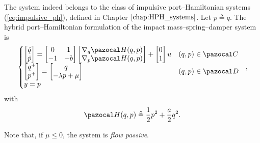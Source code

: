 \begin{rem}
    The system indeed belongs to the class of impulsive port--Hamiltonian systems (\ref{eq:impulsive_ph}), defined in Chapter $\ref{chap:HPH_systems}$.
    Let $p\triangleq\dot{q}$. The hybrid port--Hamiltonian formulation of the impact mass--spring--damper system is
    \begin{equation}
        \left\{
            \begin{matrix*}[l]
                \begin{bmatrix}\dot{q}\\\dot{p}\end{bmatrix} = \begin{bmatrix}0&1\\-1&-b\end{bmatrix}\begin{bmatrix}\nabla_q\Ha(q,p)\\\nabla_p\Ha(q,p)\end{bmatrix} + \begin{bmatrix}0\\1\end{bmatrix}u & (q,p)\in\C\\
                \begin{bmatrix}q^+\\{p}^+\end{bmatrix} =\begin{bmatrix}q\\-\lambda p+\mu\end{bmatrix}  & (q,p)\in\D\\
                y = p
            \end{matrix*}
        \right.~~,
    \end{equation}
    with 
    \begin{equation}
        \Ha(q,p) \triangleq \frac{1}{2}p^2 + \frac{a}{2}q^2.
    \end{equation}
    
    Note that, if $\mu\leq 0$, the system is \textit{flow passive}.
\end{rem}
%
